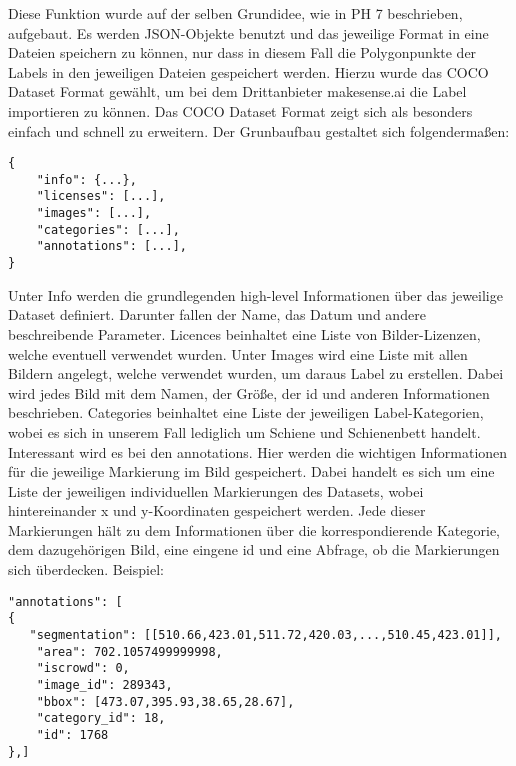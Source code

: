 \noindent
Diese Funktion wurde auf der selben Grundidee, wie in PH 7 beschrieben, aufgebaut. Es werden JSON-Objekte benutzt und das jeweilige Format in eine Dateien speichern zu können, nur dass in diesem Fall die Polygonpunkte der Labels in den jeweiligen Dateien gespeichert werden. Hierzu wurde das COCO Dataset Format gewählt, um bei dem Drittanbieter makesense.ai die Label importieren zu können. Das COCO Dataset Format zeigt sich als besonders einfach und schnell zu erweitern. Der Grunbaufbau gestaltet sich folgendermaßen:
\begin{lstlisting}  
{
    "info": {...},
    "licenses": [...],
    "images": [...],
    "categories": [...], 
    "annotations": [...],
}
\end{lstlisting}
Unter Info werden die grundlegenden high-level Informationen über das jeweilige Dataset definiert. Darunter fallen der Name, das Datum und andere beschreibende Parameter. Licences beinhaltet eine Liste von Bilder-Lizenzen, welche eventuell verwendet wurden. Unter Images wird eine Liste mit allen Bildern angelegt, welche verwendet wurden, um daraus Label zu erstellen. Dabei wird jedes Bild mit dem Namen, der Größe, der id und anderen Informationen beschrieben. Categories beinhaltet eine Liste der jeweiligen Label-Kategorien, wobei es sich in unserem Fall lediglich um Schiene und Schienenbett handelt. Interessant wird es bei den annotations. Hier werden die wichtigen Informationen für die jeweilige Markierung im Bild gespeichert. Dabei handelt es sich um eine Liste der jeweiligen individuellen Markierungen des Datasets, wobei hintereinander x und y-Koordinaten gespeichert werden. Jede dieser Markierungen hält zu dem Informationen über die korrespondierende Kategorie, dem dazugehörigen Bild, eine eingene id und eine Abfrage, ob die Markierungen sich überdecken. Beispiel:
\begin{lstlisting}  
"annotations": [
{
   "segmentation": [[510.66,423.01,511.72,420.03,...,510.45,423.01]],
    "area": 702.1057499999998,
    "iscrowd": 0,
    "image_id": 289343,
    "bbox": [473.07,395.93,38.65,28.67],
    "category_id": 18,
    "id": 1768
},]
\end{lstlisting}
